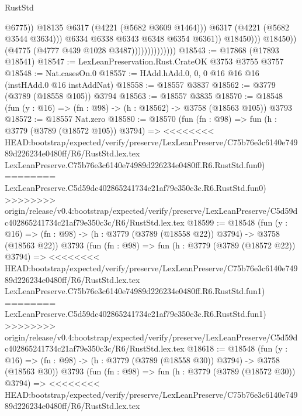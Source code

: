 \begin{lexlean}{RustStd}
\begin{coremodule}
{\begin{coremodule}
{{{{{{{{{{{{{{{{{{{{{{{{{{{{{{{                                                  @6775))
                                              @18135
                                              @6317
                                              (@4221 (@5682 @3609 @1464)))
                                            @6317
                                            (@4221 (@5682 @3544 @3634)))
                                          @6334
                                          @6338
                                          @6343
                                          @6348
                                          @6354
                                          @6361))
                                      @18450)))
                                @18450))
                            (@4775 (@4777 @439 @1028 @3487))))))))))))))
@18543 := @17868 (@17893 @18541)
@18547 := LexLeanPreservation.Rust.CrateOK @3753 @3755 @3757
@18548 := Nat.casesOn.{0}
@18557 := HAdd.hAdd.{0, 0, 0} @16 @16 @16 (instHAdd.{0} @16 instAddNat)
@18558 := @18557 @3837
@18562 := @3779 (@3789 (@18558 @105)) @3794
@18563 := @18557 @3835
@18570 := @18548 (fun (y : @16) => (fn : @98) -> (h : @18562) -> @3758 (@18563 @105)) @3793
@18572 := @18557 Nat.zero
@18580 := @18570
    (fun (fn : @98) =>
    fun (h : @3779 (@3789 (@18572 @105)) @3794) =>
<<<<<<<< HEAD:bootstrap/expected/verify/preserve/LexLeanPreserve/C75b76e3c6140e74989d226234e0480ff/R6/RustStd.lex.tex
    LexLeanPreserve.C75b76e3c6140e74989d226234e0480ff.R6.RustStd.fun0)
========
    LexLeanPreserve.C5d59dc402865241734c21af79e350c3c.R6.RustStd.fun0)
>>>>>>>> origin/release/v0.4:bootstrap/expected/verify/preserve/LexLeanPreserve/C5d59dc402865241734c21af79e350c3c/R6/RustStd.lex.tex
@18599 := @18548
    (fun (y : @16) => (fn : @98) -> (h : @3779 (@3789 (@18558 @22)) @3794) -> @3758 (@18563 @22))
    @3793
    (fun (fn : @98) =>
    fun (h : @3779 (@3789 (@18572 @22)) @3794) =>
<<<<<<<< HEAD:bootstrap/expected/verify/preserve/LexLeanPreserve/C75b76e3c6140e74989d226234e0480ff/R6/RustStd.lex.tex
    LexLeanPreserve.C75b76e3c6140e74989d226234e0480ff.R6.RustStd.fun1)
========
    LexLeanPreserve.C5d59dc402865241734c21af79e350c3c.R6.RustStd.fun1)
>>>>>>>> origin/release/v0.4:bootstrap/expected/verify/preserve/LexLeanPreserve/C5d59dc402865241734c21af79e350c3c/R6/RustStd.lex.tex
@18618 := @18548
    (fun (y : @16) => (fn : @98) -> (h : @3779 (@3789 (@18558 @30)) @3794) -> @3758 (@18563 @30))
    @3793
    (fun (fn : @98) =>
    fun (h : @3779 (@3789 (@18572 @30)) @3794) =>
<<<<<<<< HEAD:bootstrap/expected/verify/preserve/LexLeanPreserve/C75b76e3c6140e74989d226234e0480ff/R6/RustStd.lex.tex
}}}}}}}}}}}}}}}}}}}}}}}}}}}}}}}
\end{coremodule}}
\end{coremodule}
\end{lexlean}
